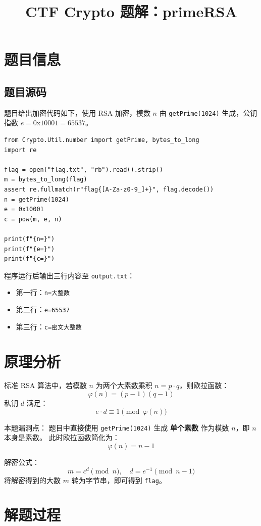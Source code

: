 \documentclass{article}
\title{CTF Crypto 题解：primeRSA}
\author{}
\date{}
\begin{document}
\maketitle

\section{题目信息}
\subsection{题目源码}
题目给出加密代码如下，使用 RSA 加密，模数 $n$ 由 \texttt{getPrime(1024)} 生成，公钥指数 $e=0$x$10001=65537$。

\begin{lstlisting}
from Crypto.Util.number import getPrime, bytes_to_long
import re

flag = open("flag.txt", "rb").read().strip()
m = bytes_to_long(flag)
assert re.fullmatch(r"flag{[A-Za-z0-9_]+}", flag.decode())
n = getPrime(1024)
e = 0x10001
c = pow(m, e, n)

print(f"{n=}")
print(f"{e=}")
print(f"{c=}")
\end{lstlisting}

程序运行后输出三行内容至 \texttt{output.txt}：
\begin{itemize}
    \item 第一行：\texttt{n=大整数}
    \item 第二行：\texttt{e=65537}
    \item 第三行：\texttt{c=密文大整数}
\end{itemize}

\section{原理分析}
标准 RSA 算法中，若模数 $n$ 为两个大素数乘积 $n=p\cdot q$，则欧拉函数：
$$
\varphi(n) = (p-1)(q-1)
$$
私钥 $d$ 满足：
$$
e\cdot d \equiv 1 \pmod{\varphi(n)}
$$

本题漏洞点：
题目中直接使用 \texttt{getPrime(1024)} 生成 \textbf{单个素数} 作为模数 $n$，即 $n$ 本身是素数。
此时欧拉函数简化为：
$$
\varphi(n) = n-1
$$

解密公式：
\[
m = c^d \pmod{n},\quad d = e^{-1} \pmod{n-1}
\]
将解密得到的大数 $m$ 转为字节串，即可得到 \texttt{flag}。

\section{解题过程}
\end{document}
